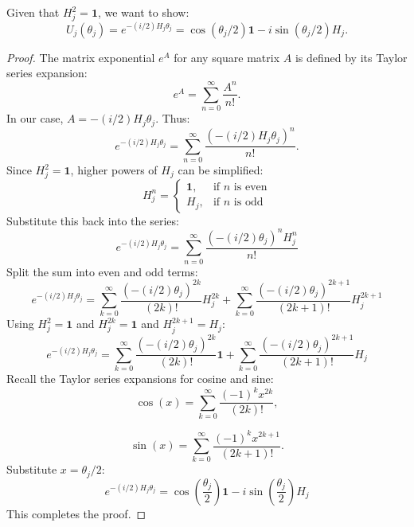 Given that $H_j^2 = \mathbf{1}$, we want to show:
\begin{equation}
    U_j(\theta_j) = e^{-(i / 2) H_j \theta_j} = \cos \left(\theta_j / 2\right) \mathbf{1} - i \sin \left(\theta_j / 2\right) H_j.
\end{equation}
\begin{proof}
    The matrix exponential $e^{A}$ for any square matrix $A$ is defined by its Taylor series expansion:
\begin{equation}
    e^{A} = \sum_{n=0}^{\infty} \frac{A^n}{n!}.
\end{equation}
In our case, $A = -(i / 2) H_j \theta_j$. Thus:
\begin{equation}
    e^{-(i / 2) H_j \theta_j} = \sum_{n=0}^{\infty} \frac{\left( -(i / 2) H_j \theta_j \right)^n}{n!}.
\end{equation}
Since $H_j^2 = \mathbf{1}$, higher powers of $H_j$ can be simplified:
\begin{equation}
    H_j^n = \begin{cases}
\mathbf{1}, & \text{if } n \text{ is even} \\
H_j, & \text{if } n \text{ is odd}
\end{cases}
\end{equation}
Substitute this back into the series:
\begin{equation}
    e^{-(i / 2) H_j \theta_j} = \sum_{n=0}^{\infty} \frac{\left( -(i / 2) \theta_j \right)^n H_j^n}{n!}
\end{equation}
Split the sum into even and odd terms:
\begin{equation}
    e^{-(i / 2) H_j \theta_j} = \sum_{k=0}^{\infty} \frac{\left( -(i / 2) \theta_j \right)^{2k}}{(2k)!} H_j^{2k} + \sum_{k=0}^{\infty} \frac{\left( -(i / 2) \theta_j \right)^{2k+1}}{(2k+1)!} H_j^{2k+1}
\end{equation}
Using $H_j^2 = \mathbf{1}$ and $H_j^{2k} = \mathbf{1}$ and $H_j^{2k+1} = H_j$:
\begin{equation}
    e^{-(i / 2) H_j \theta_j} = \sum_{k=0}^{\infty} \frac{\left( -(i / 2) \theta_j \right)^{2k}}{(2k)!} \mathbf{1} + \sum_{k=0}^{\infty} \frac{\left( -(i / 2) \theta_j \right)^{2k+1}}{(2k+1)!} H_j
\end{equation}
Recall the Taylor series expansions for cosine and sine:
\begin{equation}
    \cos(x) = \sum_{k=0}^{\infty} \frac{(-1)^k x^{2k}}{(2k)!},
\end{equation}

\begin{equation}
    \sin(x) = \sum_{k=0}^{\infty} \frac{(-1)^k x^{2k+1}}{(2k+1)!}.
\end{equation}
Substitute $x = \theta_j / 2$:
\begin{equation}
    e^{-(i / 2) H_j \theta_j} = \cos\left(\frac{\theta_j}{2}\right) \mathbf{1} - i \sin\left(\frac{\theta_j}{2}\right) H_j
\end{equation}
This completes the proof.
\end{proof}

